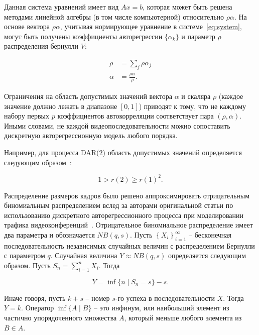 Данная система уравнений имеет вид $Ax = b$, которая может быть решена методами
линейной алгебры (в том числе компьютерной) относительно $\rho\alpha$.
На основе вектора $\rho\alpha$, учитывая нормирующее уравнение в системе~\ref{eq:system},
могут быть получены коэффициенты авторегрессии $\{\alpha_k\}$ и параметр $\rho$ распределения
бернулли $V$:

\begin{equation}
    \begin{aligned}
        \rho &= \sum_j \rho\alpha_j \\
        \alpha &= \frac{\rho\alpha}{\rho}.
    \end{aligned}
\end{equation}

Ограничения на область допустимых значений вектора
$\alpha$ и скаляра $\rho$ (каждое значение должно
лежать в диапазоне $[0, 1]$) приводят к тому, что
не каждому набору первых $p$ коэффициентов автокорреляции
соответствует пара $(\rho, \alpha)$. Иными словами,
не каждой видеопоследовательности можно сопоставить
дискретную авторегрессионную модель любого порядка.

Например, для процесса DAR($2$) область допустимых
значений определяется следующим образом~\cite{mixtures}:

\begin{equation}
    1 > r(2) \geq r(1)^2.
\end{equation}

Распределение размеров кадров было решено аппроксимировать
отрицательным биномиальным распределением вслед за авторами
оригинальной статьи по использованию дискретного авторегрессионного
процесса при моделировании трафика видеоконференций~\cite{heymanATM}.
Отрицательное биномиальное распределение имеет два параметра
и обозначается $NB(q,s)$.
Пусть $\left\{ X_i \right\}_{i=1}^\infty$ --
бесконечная последовательность независимых случайных
величин с распределением Бернулли с параметром $q$.
Случайная величина $Y\approx NB(q,s)$ определяется следующим
образом. Пусть $S_n = \sum_{i=1}^n X_i$. Тогда

\begin{equation}
    Y = \inf \{ n \mid S_n = s \} - s.
\end{equation}

Иначе говоря, пусть $k + s$ -- номер $s$-го успеха в
последовательности $X$. Тогда $Y = k$. Оператор $\inf \{ A \mid B \}$ --
это инфинум, или наибольший элемент из частично упорядоченного множества
$A$, который меньше любого элемента из $B \in A$.

